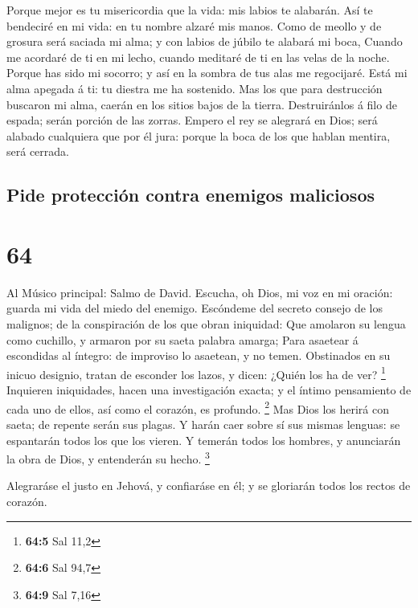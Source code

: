  Porque mejor es tu misericordia que la vida: mis labios te
alabarán.  Así te bendeciré en mi vida: en tu nombre alzaré
mis manos.  Como de meollo y de grosura será saciada mi
alma; y con labios de júbilo te alabará mi boca,  Cuando me
acordaré de ti en mi lecho, cuando meditaré de ti en las velas de la
noche.  Porque has sido mi socorro; y así en la sombra de
tus alas me regocijaré.  Está mi alma apegada á ti: tu
diestra me ha sostenido.  Mas los que para destrucción
buscaron mi alma, caerán en los sitios bajos de la tierra. 
Destruiránlos á filo de espada; serán porción de las zorras.
 Empero el rey se alegrará en Dios; será alabado cualquiera
que por él jura: porque la boca de los que hablan mentira, será cerrada.

\hypertarget{pide-protecciuxf3n-contra-enemigos-maliciosos}{%
\subsection{Pide protección contra enemigos
maliciosos}\label{pide-protecciuxf3n-contra-enemigos-maliciosos}}

\hypertarget{section-63}{%
\section{64}\label{section-63}}

 Al Músico principal: Salmo de David. Escucha, oh Dios, mi
voz en mi oración: guarda mi vida del miedo del enemigo. 
Escóndeme del secreto consejo de los malignos; de la conspiración de los
que obran iniquidad:  Que amolaron su lengua como cuchillo,
y armaron por su saeta palabra amarga;  Para asaetear á
escondidas al íntegro: de improviso lo asaetean, y no temen.
 Obstinados en su inicuo designio, tratan de esconder los
lazos, y dicen: ¿Quién los ha de ver? \footnote{\textbf{64:5} Sal 11,2}
 Inquieren iniquidades, hacen una investigación exacta; y el
íntimo pensamiento de cada uno de ellos, así como el corazón, es
profundo. \footnote{\textbf{64:6} Sal 94,7}  Mas Dios los
herirá con saeta; de repente serán sus plagas.  Y harán caer
sobre sí sus mismas lenguas: se espantarán todos los que los vieren.
 Y temerán todos los hombres, y anunciarán la obra de Dios,
y entenderán su hecho. \footnote{\textbf{64:9} Sal 7,16}

 Alegraráse el justo en Jehová, y confiaráse en él; y se
gloriarán todos los rectos de corazón.

